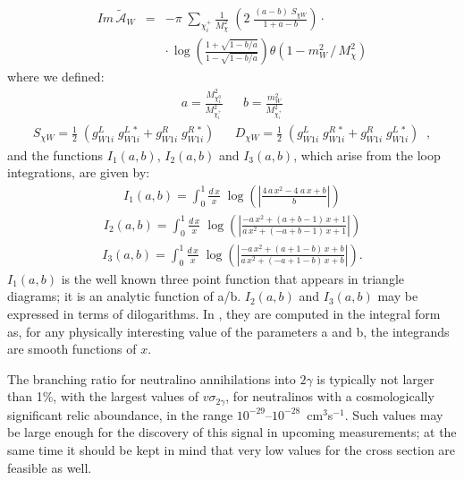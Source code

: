 \begin{eqnarray}
Im\,\tilde{\mathcal{A}}_{W} & = &
  -\pi\;\sum_{\chi^+_i} \frac{1}{M^2_{\chi}} \; \left( 2\;
   \frac{\left(a-b\right)\;S_{\chi W}}{1+a-b} \right) \cdot \nonumber
\\
  &&\cdot \, \log \left( \frac{1+\sqrt{1-b/a}}{1-\sqrt{1-b/a}} \right)
   \theta \left(1-m^2_{W}\,/\,M^2_{\chi} \right) \label{imw}
\end{eqnarray}
where we defined:
\begin{eqnarray*}
a=\frac{M^2_{\chi^0_1}}{M^2_{\chi^+_i}} &&
b=\frac{m^2_{W}}{M^2_{\chi^+_i}}
\end{eqnarray*}
\begin{eqnarray*}
S_{\chi W}=\frac{1}{2}\;\left(g^L_{W1i}\;
g^{L\,\ast}_{W1i}+g^R_{W1i}\;
  g^{R\,\ast}_{W1i} \right) && D_{\chi W}=\frac{1}{2}\;\left(
g^L_{W1i}\;
  g^{R\,\ast}_{W1i}+g^R_{W1i}\; g^{L\,\ast}_{W1i} \right)\;\; ,
\end{eqnarray*}
and the functions $I_{1}\left( a,b \right)$,
$I_{2}\left( a,b \right)$ and $I_{3}\left( a,b \right)$, which arise
from the loop integrations, are given by:
\begin{eqnarray}
I_{1}\left( a,b \right) = \int_{0}^{1} \frac{d\,x}{x} \; \log \left(
\left|
\frac{4\,a\,x^2-4\;a\,x + b}{b} \right| \right)
\end{eqnarray}
\begin{eqnarray}
I_{2}\left( a,b \right) = \int_{0}^{1} \frac{d\,x}{x} \; \log \left(
\left|
\frac{-a\,x^2+(a+b-1)\,x + 1}{a\,x^2+(-a+b-1)\,x + 1} \right| \right)
\end{eqnarray}
\begin{eqnarray}
I_{3}\left( a,b \right) = \int_{0}^{1} \frac{d\,x}{x} \; \log \left(
\left|
\frac{-a\,x^2+(a+1-b)\,x + b}{a\,x^2+(-a+1-b)\,x + b} \right| \right) .
\end{eqnarray}
$I_{1}\left( a,b \right)$ is the well known three point function that
appears in triangle diagrams; it is an analytic function of
a/b. $I_{2}\left( a,b \right)$ and $I_{3}\left( a,b \right)$ may be
expressed in terms of dilogarithms. In \ds, they are computed in the
integral form as, for any physically interesting value of the
parameters a and b, the integrands are smooth functions of $x$.

The branching ratio for neutralino annihilations into $2\gamma$ is 
typically not larger than 1\%, with the largest values of
$v\sigma_{2\gamma}$, for neutralinos with a cosmologically significant
relic aboundance, in the range $10^{-29}$--$10^{-28}$~cm$^3$s$^{-1}$.
Such values may be large enough for the discovery of this signal
in upcoming measurements; at the same time it should be kept in mind
that very low values for the cross section are feasible as well.


